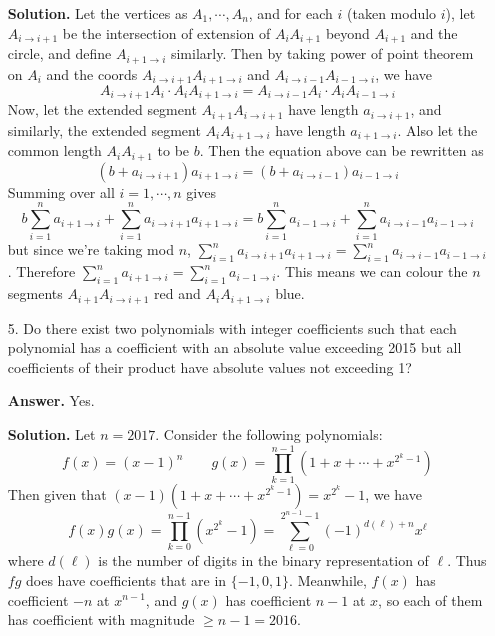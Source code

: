 \documentclass[11pt,a4paper]{article}
\begin{document}
\begin{enumerate}
	\textbf{Solution.} 
	Let the vertices as $A_1, \cdots, A_n$, and for each $i$ (taken modulo $i$), 
	let $A_{i\to i+1}$ be the intersection of extension of $A_iA_{i+1}$ beyond $A_{i+1}$ and the circle, 
	and define $A_{i+1\to i}$ similarly. 
	Then by taking power of point theorem on $A_i$ and the coords $A_{i\to i+1}A_{i+1\to i}$ and $A_{i\to i-1}A_{i-1\to i}$, we have 
	\[
	A_{i\to i+1}A_i\cdot A_iA_{i+1\to i} = A_{i\to i-1}A_i\cdot A_iA_{i-1\to i}
	\]
	Now, let the extended segment $A_{i+1}A_{i\to i+1}$ have length $a_{i\to i+1}$, 
	and similarly, the extended segment $A_iA_{i+1\to i}$ have length $a_{i+1\to i}$. 
	Also let the common length $A_iA_{i+1}$ to be $b$. Then the equation above can be rewritten as 
	\[
	(b+a_{i\to i+1})a_{i+1\to i}= (b+a_{i\to i-1})a_{i-1\to i}
	\]
	Summing over all $i=1,\cdots, n$ gives 
	\[
	b\sum_{i=1}^na_{i+1\to i} + \sum_{i=1}^n a_{i\to i+1}a_{i+1\to i}
	=b\sum_{i=1}^na_{i-1\to i} + \sum_{i=1}^n a_{i\to i-1}a_{i-1\to i}
	\]
	but since we're taking mod $n$, $\sum_{i=1}^n a_{i\to i+1}a_{i+1\to i}=\sum_{i=1}^n a_{i\to i-1}a_{i-1\to i}$. 
	Therefore $\sum_{i=1}^na_{i+1\to i}=\sum_{i=1}^na_{i-1\to i}$. 
	This means we can colour the $n$ segments $A_{i+1}A_{i\to i+1}$ red and $A_iA_{i+1\to i}$ blue. 
	
	\item[5.]
	Do there exist two polynomials with integer coefficients such that each polynomial has a coefficient
	with an absolute value exceeding 2015 but all coefficients of their product have absolute values
	not exceeding 1?
	
	\textbf{Answer.} Yes. 
	
	\textbf{Solution.} Let $n=2017$. 
	Consider the following polynomials: 
	\[
	f(x)=(x-1)^n
	\qquad 
	g(x) = \prod_{k=1}^{n-1} (1+x+\cdots + x^{2^k-1})
	\]
	Then given that $(x-1)(1+x+\cdots + x^{2^k-1})=x^{2^k}-1$, we have 
	\[
	f(x)g(x) = \prod_{k=0}^{n-1}(x^{2^k}-1)=\sum_{\ell=0}^{2^{n-1}-1}(-1)^{d(\ell)+n}x^{\ell}
	\]
	where $d(\ell)$ is the number of digits in the binary representation of $\ell$. 
	Thus $fg$ does have coefficients that are in $\{-1, 0, 1\}$. 
	Meanwhile, $f(x)$ has coefficient $-n$ at $x^{n-1}$, 
	and $g(x)$ has coefficient $n-1$ at $x$, 
	so each of them has coefficient with magnitude $\ge n-1=2016$. 
	
\end{enumerate}
\end{document}
